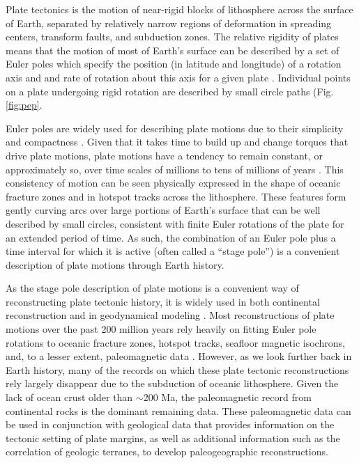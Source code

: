 \documentclass[11pt,letterpaper]{article}
\begin{document}
Plate tectonics is the motion of near-rigid blocks of lithosphere across the surface of Earth, separated by relatively narrow regions of deformation in spreading centers, transform faults, and subduction zones. The relative rigidity of plates means that the motion of most of Earth's surface can be described by a set of Euler poles which specify the position (in latitude and longitude) of a rotation axis and and rate of rotation about this axis for a given plate \citep[cf.][]{Cox2009a}. Individual points on a plate undergoing rigid rotation are described by small circle paths (Fig. \ref{fig:pep}.

Euler poles are widely used for describing plate motions due to their simplicity and compactness \citep[e.g.][]{DeMets2010a, Argus2011a}. Given that it takes time to build up and change torques that drive plate motions, plate motions have a tendency to remain constant, or approximately so, over time scales of millions to tens of millions of years \citep{Iaffaldano2012a}. This consistency of motion can be seen physically expressed in the shape of oceanic fracture zones and in hotspot tracks across the lithosphere. These features form gently curving arcs over large portions of Earth's surface that can be well described by small circles, consistent with finite Euler rotations of the plate for an extended period of time. As such, the combination of an Euler pole plus a time interval for which it is active (often called a ``stage pole'') is a convenient description of plate motions through Earth history.

As the stage pole description of plate motions is a convenient way of reconstructing plate tectonic history, it is widely used in both continental reconstruction \citep[e.g.][]{Boyden2011a} and in geodynamical modeling \citep[e.g.][]{Mcnamara2005a, Bull2014a}. Most reconstructions of plate motions over the past 200 million years rely heavily on fitting Euler pole rotations to oceanic fracture zones, hotspot tracks, seafloor magnetic isochrons, and, to a lesser extent, paleomagnetic data \citep{Muller1993a, Seton2012a, Muller2016a}. However, as we look further back in Earth history, many of the records on which these plate tectonic reconstructions rely largely disappear due to the subduction of oceanic lithosphere. Given the lack of ocean crust older than $\sim$200 Ma, the paleomagnetic record from continental rocks is the dominant remaining data. These paleomagnetic data can be used in conjunction with geological data that provides information on the tectonic setting of plate margins, as well as additional information such as the correlation of geologic terranes, to develop paleogeographic reconstructions.
\end{document}
